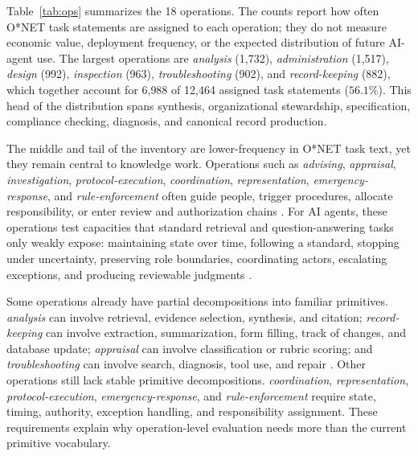 \documentclass{article}
\begin{document}
Table~\ref{tab:ops} summarizes the 18 operations.
The counts report how often O{*}NET task statements are assigned to each operation; they do not measure economic value, deployment frequency, or the expected distribution of future AI-agent use.
The largest operations are \emph{analysis} (1{,}732), \emph{administration} (1{,}517), \emph{design} (992), \emph{inspection} (963), \emph{troubleshooting} (902), and \emph{record-keeping} (882), which together account for 6{,}988 of 12{,}464 assigned task statements ($56.1\%$).
This head of the distribution spans synthesis, organizational stewardship, specification, compliance checking, diagnosis, and canonical record production.

The middle and tail of the inventory are lower-frequency in O{*}NET task text, yet they remain central to knowledge work.
Operations such as \emph{advising}, \emph{appraisal}, \emph{investigation}, \emph{protocol-execution}, \emph{coordination}, \emph{representation}, \emph{emergency-response}, and \emph{rule-enforcement} often guide people, trigger procedures, allocate responsibility, or enter review and authorization chains \citep{abbott1988system,freidson2001professionalism,carlile2002pragmatic,malone1994coordination}.
For AI agents, these operations test capacities that standard retrieval and question-answering tasks only weakly expose: maintaining state over time, following a standard, stopping under uncertainty, preserving role boundaries, coordinating actors, escalating exceptions, and producing reviewable judgments \citep{suchman1987plans,weick2007managing,haynes2009surgical}.

Some operations already have partial decompositions into familiar primitives.
\emph{analysis} can involve retrieval, evidence selection, synthesis, and citation; \emph{record-keeping} can involve extraction, summarization, form filling, track of changes, and database update; \emph{appraisal} can involve classification or rubric scoring; and \emph{troubleshooting} can involve search, diagnosis, tool use, and repair \citep{lewis2020rag,petroni2021kilt,maynez2020faithfulness,ji2023hallucination,schick2023toolformer,yao2023react}.
Other operations still lack stable primitive decompositions.
\emph{coordination}, \emph{representation}, \emph{protocol-execution}, \emph{emergency-response}, and \emph{rule-enforcement} require state, timing, authority, exception handling, and responsibility assignment.
These requirements explain why operation-level evaluation needs more than the current primitive vocabulary.
\end{document}
